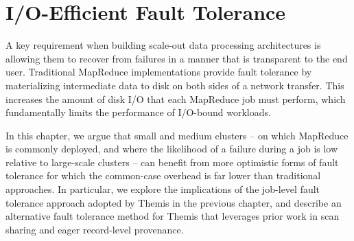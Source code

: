 \def\themis{Themis\xspace}

\chapter{I/O-Efficient Fault Tolerance}
\label{chapter:fault_tolerance}

A key requirement when building scale-out data processing architectures is
allowing them to recover from failures in a manner that is transparent to the
end user. Traditional MapReduce implementations provide fault tolerance by
materializing intermediate data to disk on both sides of a network
transfer. This increases the amount of disk I/O that each MapReduce job must
perform, which fundamentally limits the performance of I/O-bound workloads.

In this chapter, we argue that small and medium clusters -- on which MapReduce
is commonly deployed, and where the likelihood of a failure during a job is low
relative to large-scale clusters -- can benefit from more optimistic forms of
fault tolerance for which the common-case overhead is far lower than
traditional approaches. In particular, we explore the implications of the
job-level fault tolerance approach adopted by Themis in the previous chapter,
and describe an alternative fault tolerance method for Themis that leverages
prior work in scan sharing and eager record-level provenance.











